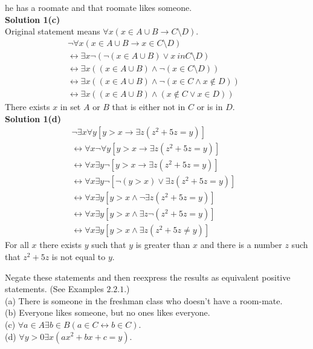 he has a roomate and that roomate likes someone. \\
\textbf{Solution 1(c)} \\
Original statement means $\forall{x}(x \in A \cup B \rightarrow C \setminus D)$.
\begin{align*}
&    \neg \forall{x}(x \in A \cup B \rightarrow x \in C \setminus D) && \\
&    \leftrightarrow    \exists{x}\neg(\neg(x \in A \cup B) \vee x\ in C \setminus D) && \\
&    \leftrightarrow    \exists{x}((x \in A \cup B) \wedge \neg(x \in C \setminus D)) && \\
&    \leftrightarrow    \exists{x}((x \in A \cup B) \wedge \neg(x \in C \wedge x \not \in D)) && \\
&    \leftrightarrow    \exists{x}((x \in A \cup B) \wedge (x \not \in C \vee x \in D))
\end{align*}
There exists $x$ in set $A$ or $B$ that is either not in $C$ or is in $D$. \\
\textbf{Solution 1(d)} \\
\begin{align*}
&    \neg \exists{x}\forall{y}[y > x \rightarrow \exists{z}(z^2 + 5z = y)] && \\
&    \leftrightarrow    \forall{x}\neg\forall{y}[y > x \rightarrow \exists{z}(z^2 + 5z = y)] && \\
&    \leftrightarrow   \forall{x}\exists{y}\neg[y > x \rightarrow \exists{z}(z^2 + 5z = y)] && \\
&    \leftrightarrow   \forall{x}\exists{y}\neg[\neg(y > x) \vee \exists{z}(z^2 + 5z = y)] && \\
&    \leftrightarrow    \forall{x}\exists{y}[y > x \wedge \neg\exists{z}(z^2 + 5z = y)] && \\
&    \leftrightarrow    \forall{x}\exists{y}[y > x \wedge \exists{z}\neg(z^2 + 5z = y)] && \\
&    \leftrightarrow    \forall{x}\exists{y}[y > x \wedge \exists{z}(z^2 + 5z \not = y)] 
\end{align*}
For all $x$ there exists $y$ such that $y$ is greater than $x$ and 
there is a number $z$ such that $z^2 + 5z$ is not equal to $y$.

\begin{tcolorbox}[title=Problem 2, breakable]
    Negate these statements and then reexpress the results as equivalent positive statements.
    (See Examples $2.2.1$.) \\
    (a) There is someone in the freshman class who doesn't have a room-mate. \\
    (b) Everyone likes someone, but no ones likes everyone. \\
    (c) $\forall{a \in A} \exists{b \in B} (a \in C \leftrightarrow b \in C)$. \\
    (d) $\forall{y > 0 \exists{x}}(ax^2 + bx + c = y)$.
\end{tcolorbox}

